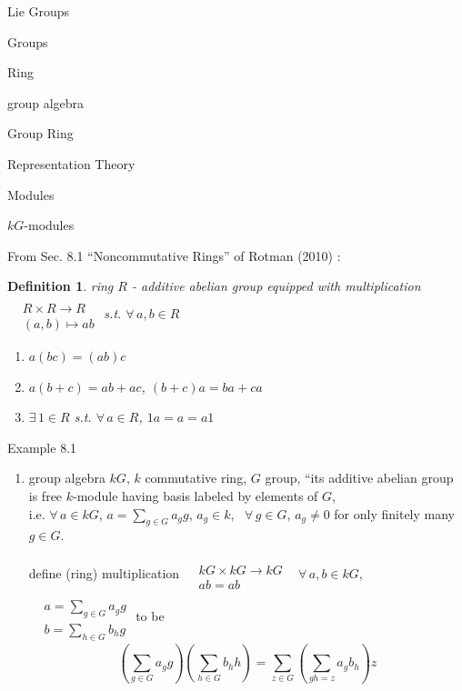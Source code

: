\documentclass[10pt]{amsart}
\newtheorem{definition}{Definition}
\begin{document}
\begin{multicols*}{2}
\begin{description}
	\item Lie Groups 
	\item Groups
	\item Ring
	\item group algebra
	\item Group Ring
	\item Representation Theory
	\item Modules
	\item $kG$-modules
\end{description}

From Sec. 8.1 ``Noncommutative Rings'' of Rotman (2010) \cite{JRotman2010}:

\begin{definition}
	ring $R$ - additive abelian group equipped with multiplication $\begin{aligned} & \quad \\ 
	& R \times R \to R \\
	& (a,b) \mapsto ab \end{aligned}$ s.t. $\forall \, a ,b \in R$
	
	\begin{enumerate}
		\item[(i)] $a(bc) = (ab)c$ 
		\item[(ii)] $a(b+c) = ab+ ac$, $(b+c)a = ba + ca$ 
		\item[(iii)] $\exists \, 1 \in R$ s.t. $\forall \, a \in R$, $1a = a = a1$
	\end{enumerate}
\end{definition}

Example 8.1\cite{JRotman2010}
\begin{enumerate}
	\item[(ii)] group algebra $kG$, $k$ commutative ring, $G$ group, ``its additive abelian group is free $k$-module having basis labeled by elements of $G$, \\
	i.e. $\forall \, a \in kG$, $a = \sum_{g\in G} a_g g$, $a_g \in k$, \, $\forall \, g \in G$, $a_g \neq 0$ for only finitely many $g\in G$.  
	
	define (ring) multiplication $\begin{aligned} & \quad \\ 
	& kG \times kG \to kG \\
	& ab = ab \end{aligned}$ \, $\forall \, a,b \in kG$, $\begin{aligned} & \quad \\ 
	& a = \sum_{g\in G} a_g g \\
	& b = \sum_{h \in G} b_h g \end{aligned}$ to be 
	\[
	\left( \sum_{g \in G} a_g g \right) \left( \sum_{h \in G} b_h h \right) = \sum_{ z\in G} \left( \sum_{ gh = z} a_g b_h \right)z
	\]
	

\end{enumerate}
\end{multicols*}
\end{document}
